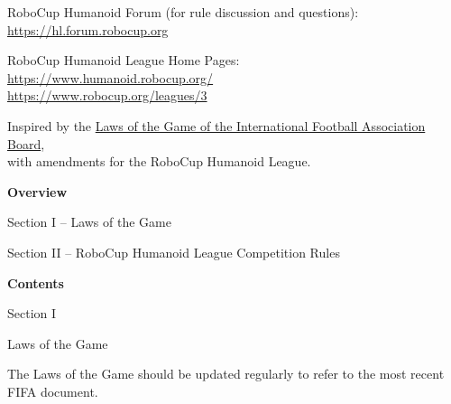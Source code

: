 \documentclass[a4paper]{article}
\begin{document}
\medskip
RoboCup Humanoid Forum (for rule discussion and questions):\\
\url{https://hl.forum.robocup.org}

\medskip
RoboCup Humanoid League Home Pages:\\
\url{https://www.humanoid.robocup.org/}\\
\url{https://www.robocup.org/leagues/3}

\medskip
Inspired by the \href{https://resources.fifa.com/image/upload/laws-of-the-game-2018-19.pdf?cloudid=khhloe2xoigyna8juxw3}{\textcolor[rgb]{0,0,0.5}{Laws of the Game of the International Football Association Board}},\\
with amendments for the RoboCup Humanoid League.

\setcounter{figure}{0}

\clearpage

{\bfseries\color[rgb]{0.4,0.4,0.4}
Overview}

\bigskip

Section I -- Laws of the Game

\bigskip

Section II -- RoboCup Humanoid League Competition Rules


\clearpage

{\bfseries\color[rgb]{0.4,0.4,0.4}
Contents}

\renewcommand\contentsname{}
\vspace*{-1cm}
\tableofcontents
{}



\clearpage

\begin{center}
\Huge\bfseries{
\vspace*{3cm}
Section I

\vspace*{2cm}

Laws of the Game}
\end{center}

\vspace*{12cm}

The Laws of the Game should be updated regularly to refer to the most
recent FIFA document.

\bigskip

\end{document}
